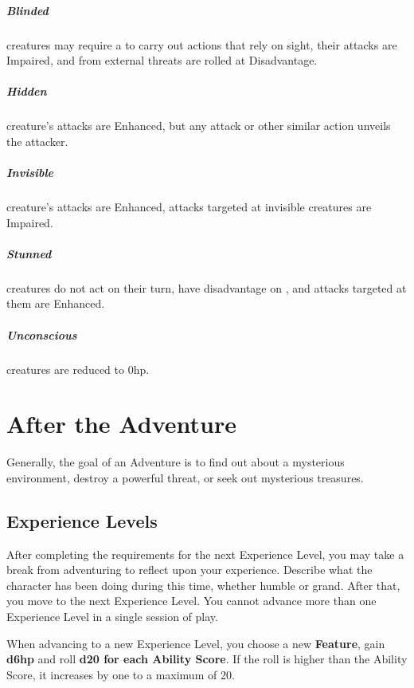 \documentclass[itdr]{subfiles}
\begin{document}
\vfill
{}

\subparagraph{Blinded} creatures may require a  to carry out actions that rely on sight, their attacks are Impaired, and  from external threats are rolled at Disadvantage.

\vfill
{}
\subparagraph{Hidden} creature's attacks are Enhanced, but any attack or other similar action unveils the attacker.

\vfill
{}
\subparagraph{Invisible} creature's attacks are Enhanced, attacks targeted at invisible creatures are Impaired.

\vfill
{}
\subparagraph{Stunned} creatures do not act on their turn, have disadvantage on , and attacks targeted at them are Enhanced.

\vfill
{}
\subparagraph{Unconscious} creatures are reduced to 0hp.

\vfill
\break

\section{After the Adventure}

Generally, the goal of an Adventure is to find out about a mysterious environment, destroy a powerful threat, or seek out mysterious treasures.

\vfill
\subsection{Experience Levels}
After completing the requirements for the next Experience Level, you may take a break from adventuring to reflect upon your experience. Describe what the character has been doing during this time, whether humble or grand. After that, you move to the next Experience Level. You cannot advance more than one Experience Level in a single session of play.

When advancing to a new Experience Level, you choose a new \textbf{Feature}, gain \textbf{d6hp} and roll \textbf{d20 for each Ability Score}. If the roll is higher than the Ability Score, it increases by one to a maximum of 20.
\end{document}
